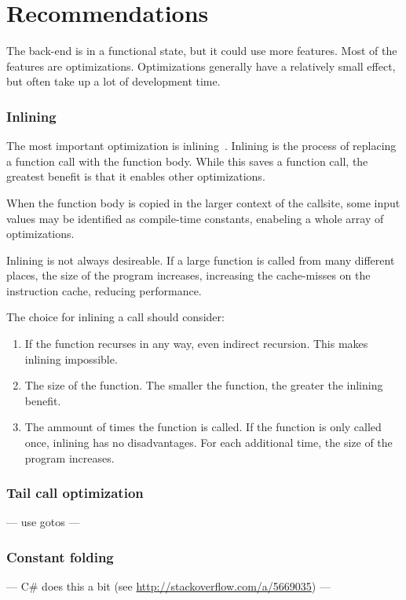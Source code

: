 \section{Recommendations}
The back-end is in a functional state, but it could use more features.
Most of the features are optimizations.
Optimizations generally have a relatively small effect, but often take up a lot of development time.

\subsubsection{Inlining}
The most important optimization is inlining~\cite{inlining}.
Inlining is the process of replacing a function call with the function body.
While this saves a function call, the greatest benefit is that it enables other optimizations.

When the function body is copied in the larger context of the callsite, some input values may be identified as compile-time constants, enabeling a whole array of optimizations. 

Inlining is not always desireable.
If a large function is called from many different places, the size of the program increases, increasing the cache-misses on the instruction cache, reducing performance.

The choice for inlining a call should consider:
\begin{enumerate}
    \item If the function recurses in any way, even indirect recursion.
        This makes inlining impossible.
    \item The size of the function.
        The smaller the function, the greater the inlining benefit.
    \item The ammount of times the function is called.
        If the function is only called once, inlining has no disadvantages.
        For each additional time, the size of the program increases.
\end{enumerate}

\subsubsection{Tail call optimization}
--- use gotos ---

\subsubsection{Constant folding}
--- C\# does this a bit (see \url{http://stackoverflow.com/a/5669035}) ---

